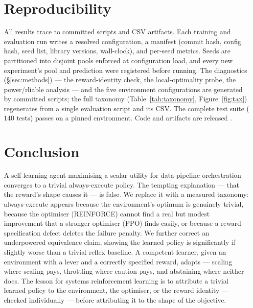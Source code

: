 \documentclass[10pt,twocolumn]{article}
\begin{document}
\section{Reproducibility}
\label{sec:repro}

All results trace to committed scripts and CSV artifacts. Each training and
evaluation run writes a resolved configuration, a manifest (commit hash, config
hash, seed list, library versions, wall-clock), and per-seed metrics. Seeds are
partitioned into disjoint pools enforced at configuration load, and every new
experiment's pool and prediction were registered before running. The diagnostics
(\S\ref{sec:methods}) --- the reward-identity check, the local-optimality probe,
the power/rliable analysis --- and the five environment configurations are
generated by committed scripts; the full taxonomy
(Table~\ref{tab:taxonomy}, Figure~\ref{fig:tax}) regenerates from a single
evaluation script and its CSV. The complete test suite ($140$ tests) passes on a
pinned environment. Code and artifacts are released
\cite{mohamed2026repo}.

\section{Conclusion}
\label{sec:conclusion}

A self-learning agent maximising a scalar utility for data-pipeline orchestration
converges to a trivial always-execute policy. The tempting explanation --- that
the reward's shape causes it --- is false. We replace it with a measured
taxonomy: always-execute appears because the environment's optimum is genuinely
trivial, because the optimiser (REINFORCE) cannot find a real but modest
improvement that a stronger optimiser (PPO) finds easily, or because a
reward-specification defect deletes the failure penalty. We further correct an
underpowered equivalence claim, showing the learned policy is significantly if
slightly worse than a trivial reflex baseline. A competent learner, given an
environment with a lever and a correctly specified reward, adapts --- scaling
where scaling pays, throttling where caution pays, and abstaining where neither
does. The lesson for systems reinforcement learning is to attribute a trivial
learned policy to the environment, the optimiser, or the reward identity ---
checked individually --- before attributing it to the shape of the objective.

\printbibliography
\end{document}
